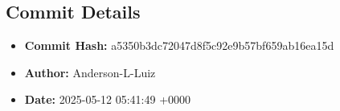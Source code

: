 \documentclass{article}
\begin{document}
\subsection{Commit Details}
\begin{itemize}
    \item \textbf{Commit Hash:} a5350b3dc72047d8f5c92e9b57bf659ab16ea15d
    \item \textbf{Author:} Anderson-L-Luiz
    \item \textbf{Date:} 2025-05-12 05:41:49 +0000
\end{itemize}
\hrulefill
\end{document}
